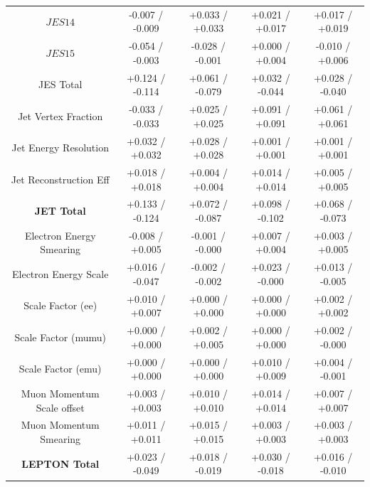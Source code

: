 \begin{table}[htbp]
\begin{center}
\begin{tabular}{|c|c|c|c|c|}
   $JES {14}$                          &  -0.007   / -0.009   & +0.033   / +0.033   & +0.021   / +0.017   & +0.017   / +0.019   \\
   $JES {15}$                          &  -0.054   / -0.003   & -0.028   / -0.001   & +0.000   / +0.004   & -0.010   / +0.006   \\
   \hline
   JES Total                             &  +0.124   / -0.114   & +0.061   / -0.079   & +0.032   / -0.044   & +0.028   / -0.040   \\
   Jet Vertex Fraction                   &  -0.033   / -0.033   & +0.025   / +0.025   & +0.091   / +0.091   & +0.061   / +0.061   \\
   Jet Energy Resolution                 &  +0.032   / +0.032   & +0.028   / +0.028   & +0.001   / +0.001   & +0.001   / +0.001   \\
   Jet Reconstruction Eff                &  +0.018   / +0.018   & +0.004   / +0.004   & +0.014   / +0.014   & +0.005   / +0.005   \\
   \hline
   \textbf{JET Total}                    &  +0.133   / -0.124   & +0.072   / -0.087   & +0.098   / -0.102   & +0.068   / -0.073   \\
   \hline
   Electron Energy Smearing              &  -0.008   / +0.005   & -0.001   / -0.000   & +0.007   / +0.004   & +0.003   / +0.005   \\
   Electron Energy Scale                 &  +0.016   / -0.047   & -0.002   / -0.002   & +0.023   / -0.000   & +0.013   / -0.005   \\
   Scale Factor (ee)                     &  +0.010   / +0.007   & +0.000   / +0.000   & +0.000   / +0.000   & +0.002   / +0.002   \\
   Scale Factor (mumu)                   &  +0.000   / +0.000   & +0.002   / +0.005   & +0.000   / +0.000   & +0.002   / -0.000   \\
   Scale Factor (emu)                    &  +0.000   / +0.000   & +0.000   / +0.000   & +0.010   / +0.009   & +0.004   / -0.001   \\
   Muon Momentum Scale offset            &  +0.003   / +0.003   & +0.010   / +0.010   & +0.014   / +0.014   & +0.007   / +0.007   \\
   Muon Momentum Smearing                &  +0.011   / +0.011   & +0.015   / +0.015   & +0.003   / +0.003   & +0.003   / +0.003   \\
   \hline
   \textbf{LEPTON Total}                 &  +0.023   / -0.049   & +0.018   / -0.019   & +0.030   / -0.018   & +0.016   / -0.010   \\

\end{tabular}
\end{center}
\end{table}
